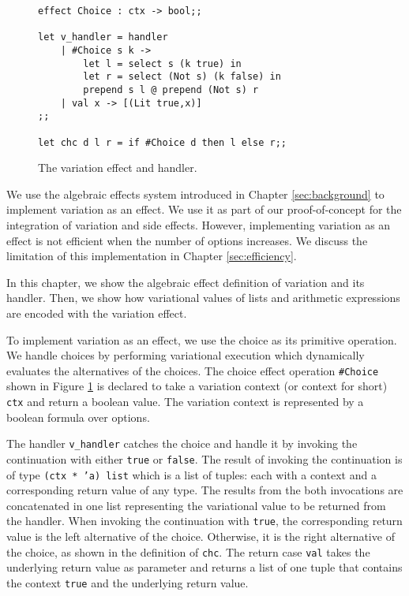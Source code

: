 \begin{figure}[!htb]
  \centering
\begin{lstlisting}[]
effect Choice : ctx -> bool;;

let v_handler = handler
    | #Choice s k -> 
        let l = select s (k true) in
        let r = select (Not s) (k false) in
	    prepend s l @ prepend (Not s) r
    | val x -> [(Lit true,x)]
;;

let chc d l r = if #Choice d then l else r;;
\end{lstlisting}
  \caption{The variation effect and handler.}
  \label{fig:choice-impl}
\end{figure}
%
We use the algebraic effects system introduced in Chapter \ref{sec:background} to implement variation as an effect. We use it as part of our proof-of-concept for the integration of variation and side effects. However, implementing variation as an effect is not efficient when the number of options increases. We discuss the limitation of this implementation in Chapter \ref{sec:efficiency}. 

In this chapter, we show the algebraic effect definition of variation and its handler. Then, we show how variational values of lists and arithmetic expressions are encoded with the variation effect.

To implement variation as an effect, we use the choice as its primitive operation. We handle choices by performing variational execution which dynamically evaluates the alternatives of the choices. The choice effect operation \texttt{\#Choice} shown in Figure \ref{fig:choice-impl} is declared to take a variation context (or context for short) \texttt{ctx} and return a boolean value. The variation context is represented by a boolean formula over options. 

The handler \texttt{v\_handler} catches the choice and handle it by invoking the continuation with either \texttt{true} or \texttt{false}. The result of invoking the continuation is of type \texttt{(ctx * 'a) list} which is a list of tuples: each with a context and a corresponding return value of any type.
The results from the both invocations are concatenated in one list representing the variational value to be returned from the handler. When invoking the continuation with \texttt{true}, the corresponding return value is the left alternative of the choice. Otherwise, it is the right alternative of the choice, as shown in the definition of \texttt{chc}. The return case \texttt{val} takes the underlying return value as parameter and returns a list of one tuple that contains the context \texttt{true} and the underlying return value.

